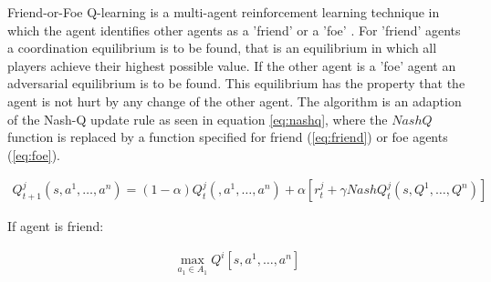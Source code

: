 Friend-or-Foe Q-learning is a multi-agent reinforcement learning technique in which the agent identifies other agents as a 'friend' or a 'foe' . For 'friend' agents a coordination equilibrium is to be found, that is an equilibrium in which all players achieve their highest possible value. If the other agent is a 'foe' agent an adversarial equilibrium is to be found. This equilibrium has the property that the agent is not hurt by any change of the other agent. The algorithm is an adaption of the Nash-Q update rule as seen in equation \ref{eq:nashq}, where the $NashQ$ function is replaced by a function specified for friend (\ref{eq:friend}) or foe agents (\ref{eq:foe}). \\
\begin{mdframed}
\begin{align}
Q_{t+1}^j(s,a^1, \dots, a^n) = (1-\alpha)Q_t^j(,a^1, \dots, a^n )+ \alpha[r_t^j+\gamma NashQ_t^j(s, Q^1, \dots, Q^n)]\label{eq:nashq}
\end{align}
\end{mdframed}

If agent is friend:
\begin{mdframed}
\begin{align}
\max\limits_{a_1\in A_1} Q^i[s,a^1, \dots, a^n]\label{eq:friend}\\
\end{align}
\end{mdframed}


